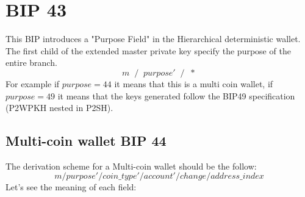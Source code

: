   
\section{BIP 43}
This BIP introduces a "Purpose Field" in the Hierarchical deterministic wallet. The first child of the extended master private key specify the purpose of the entire branch.
\begin{equation*}
m\; \;/\;\; purpose'\;\; /\;\; *
\end{equation*}
For example if $purpose=44$ it means that this is a multi coin wallet, if $purpose=49$ it means that the keys generated follow the BIP49 specification (P2WPKH nested in P2SH).

\subsection{Multi-coin wallet BIP 44}
The derivation scheme for a Multi-coin wallet should be the follow:
\begin{equation*}
m / purpose' / coin\_type' / account' / change / address\_index
\end{equation*}
Let's see the meaning of each field:
